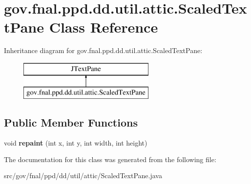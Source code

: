 \hypertarget{classgov_1_1fnal_1_1ppd_1_1dd_1_1util_1_1attic_1_1ScaledTextPane}{\section{gov.\-fnal.\-ppd.\-dd.\-util.\-attic.\-Scaled\-Text\-Pane Class Reference}
\label{classgov_1_1fnal_1_1ppd_1_1dd_1_1util_1_1attic_1_1ScaledTextPane}
}
Inheritance diagram for gov.\-fnal.\-ppd.\-dd.\-util.\-attic.\-Scaled\-Text\-Pane\-:\begin{figure}[H]
\begin{center}
\leavevmode
\includegraphics[height=2.000000cm]{classgov_1_1fnal_1_1ppd_1_1dd_1_1util_1_1attic_1_1ScaledTextPane}
\end{center}
\end{figure}
\subsection*{Public Member Functions}
\begin{DoxyCompactItemize}
\item 
\hypertarget{classgov_1_1fnal_1_1ppd_1_1dd_1_1util_1_1attic_1_1ScaledTextPane_a497466be4795635f975fdcbf86346d07}{void {\bfseries repaint} (int x, int y, int width, int height)}\label{classgov_1_1fnal_1_1ppd_1_1dd_1_1util_1_1attic_1_1ScaledTextPane_a497466be4795635f975fdcbf86346d07}

\end{DoxyCompactItemize}


The documentation for this class was generated from the following file\-:\begin{DoxyCompactItemize}
\item 
src/gov/fnal/ppd/dd/util/attic/Scaled\-Text\-Pane.\-java\end{DoxyCompactItemize}
